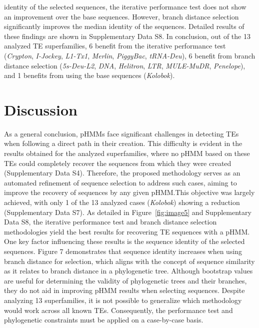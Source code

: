 \documentclass[unnumsec,webpdf,contemporary,large]{oup-authoring-template}%
\theoremstyle{thmstyleone}%
\theoremstyle{thmstyletwo}%
\theoremstyle{thmstylethree}%
\begin{document}
identity of the selected sequences, the iterative performance test does not show
an improvement over the base sequences. However, branch distance selection
significantly improves the median identity of the sequences. Detailed results of
these findings are shown in Supplementary Data S8. In conclusion, out of the 13
analyzed TE superfamilies, 6 benefit from the iterative performance test
(\textit{Crypton}, \textit{I{-}Jockey}, \textit{L1{-}Tx1}, \textit{Merlin}, \textit{PiggyBac}, \textit{tRNA{-}Deu}), 6 benefit from branch
distance selection (\textit{5s{-}Deu{-}L2}, \textit{DNA}, \textit{Helitron}, \textit{LTR}, \textit{ MULE{-}MuDR}, \textit{Penelope}), and 1
benefits from using the base sequences (\textit{Kolobok}).

\section{Discussion}\label{sec4}

As a general conclusion, pHMMs face significant challenges in detecting TEs when
following a direct path in their creation. This difficulty is evident in the
results obtained for the analyzed superfamilies, where no pHMM based on these
TEs could completely recover the sequences from which they were created
(Supplementary Data S4). Therefore, the proposed methodology serves as an
automated refinement of sequence selection to address such cases, aiming to
improve the recovery of sequences by any given pHMM.\@ This objective was
largely achieved, with only 1 of the 13 analyzed cases (\textit{Kolobok}) showing a
reduction (Supplementary Data S7). As detailed in Figure~\ref*{fig:image5} and Supplementary
Data S8, the iterative performance test and branch distance selection
methodologies yield the best results for recovering TE sequences with a pHMM.\@
One key factor influencing these results is the sequence identity of the
selected sequences. Figure 7 demonstrates that sequence identity increases when
using branch distance for selection, which aligns with the concept of sequence
similarity as it relates to branch distance in a phylogenetic tree. Although
bootstrap values are useful for determining the validity of phylogenetic trees
and their branches, they do not aid in improving pHMM results when selecting
sequences. Despite analyzing 13 superfamilies, it is not possible to generalize
which methodology would work across all known TEs. Consequently, the performance
test and phylogenetic constraints must be applied on a case{-}by{-}case basis.
\end{document}
